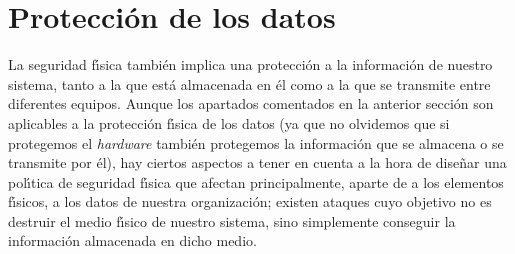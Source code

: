 \section{Protecci\'on de los datos} 
La seguridad f\'{\i}sica tambi\'en implica una protecci\'on a la informaci\'on
de nuestro sistema, tanto a la que est\'a almacenada en \'el como a la que
se transmite entre diferentes equipos. Aunque los apartados comentados en la
anterior secci\'on son aplicables a la protecci\'on f\'{\i}sica de los datos
(ya que no olvidemos que si protegemos el {\it hardware} tambi\'en protegemos
la informaci\'on que se almacena o se transmite por \'el), hay ciertos aspectos
a tener en cuenta a la hora de dise\~nar una pol\'{\i}tica de seguridad 
f\'{\i}sica que afectan principalmente, aparte de a los elementos f\'{\i}sicos,
a los datos de nuestra organizaci\'on; existen ataques cuyo objetivo no es
destruir el medio f\'{\i}sico de nuestro sistema, sino simplemente conseguir la
informaci\'on almacenada en dicho medio.

